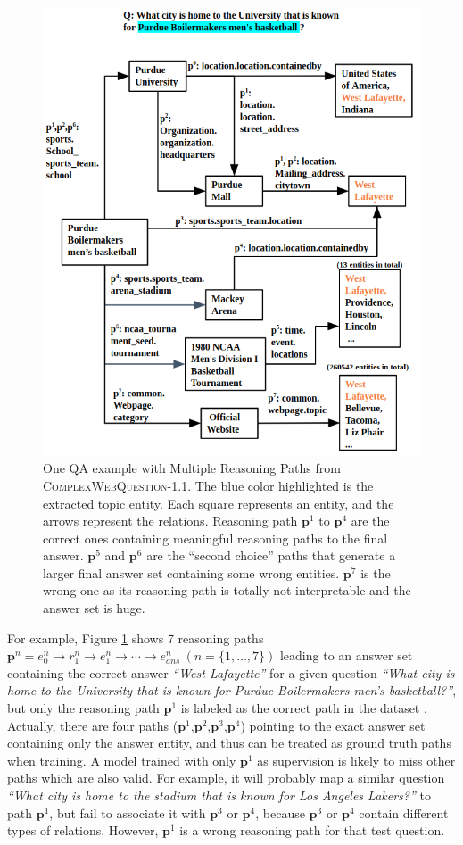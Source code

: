\begin{figure}[t]
 \centering
 \includegraphics[width=0.7\linewidth]{Images/fig1.png}
 \caption{One QA example with Multiple Reasoning Paths from \textsc{ComplexWebQuestion}-1.1. The blue color highlighted is the extracted topic entity. Each square represents an entity, and the arrows represent the relations. Reasoning path $\mathbf{p}^1$ to $\mathbf{p}^4$ are the correct ones containing meaningful reasoning paths to the final answer. $\mathbf{p}^5$ and $\mathbf{p}^6$ are the ``second choice'' paths that generate a larger final answer set containing some wrong entities. $\mathbf{p}^7$ is the wrong one as its reasoning path is totally not interpretable and the answer set is huge.}
 \label{QAPaths}
\end{figure}

For example, Figure \ref{QAPaths} shows 7 reasoning paths $\mathbf{p}^n={e^n_0\rightarrow r^n_1 \rightarrow e^n_1 \rightarrow \cdots \rightarrow e^n_{ans}}\ (n=\lbrace 1, \dots, 7 \rbrace)$ leading to an answer set containing the correct answer \textit{``West Lafayette''} for a given question \textit{``What city is home to the University that is known for Purdue Boilermakers men's basketball?''}, but only the reasoning path $\mathbf{p}^1$ is labeled as the correct path in the dataset \cite{DBLP:journals/corr/abs-1807-09623}. Actually, there are four paths ($\mathbf{p}^1$,$\mathbf{p}^2$,$\mathbf{p}^3$,$\mathbf{p}^4$) pointing to the exact answer set containing only the answer entity, and thus can be treated as ground truth paths when training. A model trained with only $\mathbf{p}^1$ as supervision is likely to miss other paths which are also valid. For example, it will probably map a similar question \textit{``What city is home to the stadium that is known for Los Angeles Lakers?''} to path $\mathbf{p}^1$, but fail to associate it with $\mathbf{p}^3$ or $\mathbf{p}^4$, because $\mathbf{p}^3$ or $\mathbf{p}^4$ contain different types of relations. However, $\mathbf{p}^1$ is a wrong reasoning path for that test question.

